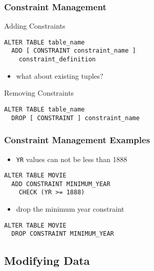 \documentclass[dvipsnames]{beamer}
\theoremstyle{plain}
\begin{document}
\begin{frame}[fragile]
  \frametitle{Constraint Management}

  \begin{block}{Adding Constraints}
    \begin{lstlisting}
ALTER TABLE table_name
  ADD [ CONSTRAINT constraint_name ]
    constraint_definition
    \end{lstlisting}
  \end{block}

  \pause
  \begin{itemize}
    \item what about existing tuples?
  \end{itemize}

  \pause
  \begin{block}{Removing Constraints}
    \begin{lstlisting}
ALTER TABLE table_name
  DROP [ CONSTRAINT ] constraint_name
    \end{lstlisting}
  \end{block}
\end{frame}

\begin{frame}[fragile]
  \frametitle{Constraint Management Examples}

  \begin{example}
    \begin{itemize}
      \item \texttt{YR} values can not be less than 1888
    \end{itemize}

    \begin{lstlisting}
ALTER TABLE MOVIE
  ADD CONSTRAINT MINIMUM_YEAR
    CHECK (YR >= 1888)
    \end{lstlisting}

    \pause
    \begin{itemize}
      \item drop the minimum year constraint
    \end{itemize}

    \begin{lstlisting}
ALTER TABLE MOVIE
  DROP CONSTRAINT MINIMUM_YEAR
    \end{lstlisting}
  \end{example}
\end{frame}

\subsection{Modifying Data}
\end{document}
